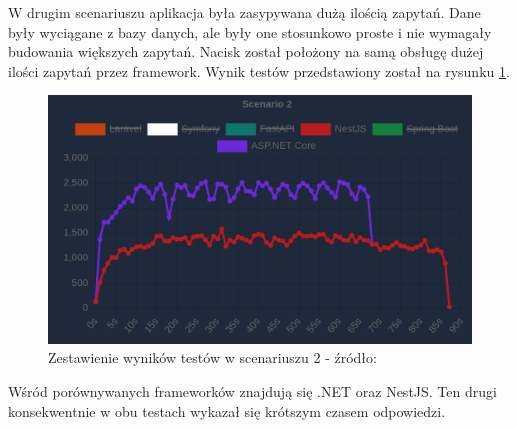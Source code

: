 W drugim scenariuszu aplikacja była zasypywana dużą ilością zapytań.
Dane były wyciągane z bazy danych, ale były one stosunkowo proste i nie wymagały budowania większych zapytań.
Nacisk został położony na samą obsługę dużej ilości zapytań przez framework.
Wynik testów przedstawiony został na rysunku \ref{rys:oklatest2}.
\begin{figure}[!hb]
	\centering \includegraphics[width=1\linewidth]{rysunki/okla_test_2.png}
	\caption{Zestawienie wyników testów w scenariuszu 2 - źródło: \cite{okami1012024Benchmark}}
	\label{rys:oklatest2}
\end{figure}



Wśród porównywanych frameworków znajdują się .NET oraz NestJS.
Ten drugi konsekwentnie w obu testach wykazał się krótszym czasem odpowiedzi.

